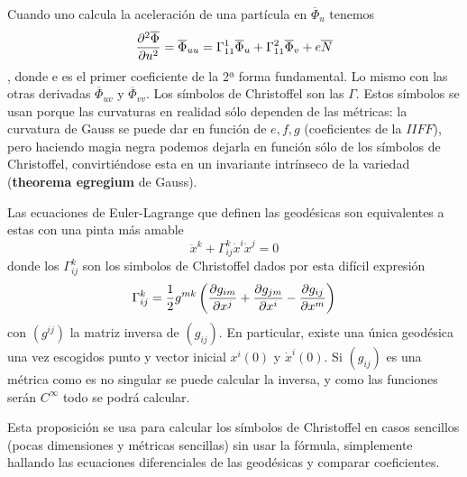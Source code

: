 \documentclass[palatino, bibnumbers]{apuntes}
\begin{document}
\indent Cuando uno calcula la aceleración de una partícula en $\overline{\Phi}_u$ tenemos $$\pdv[2]{\overline{\Phi}}{u}=\overline{\Phi}_{uu}=\Gamma^1_{11}\overline{\Phi}_u+\Gamma^2_{11}\overline{\Phi}_v+e\overline{N}$$, donde e es el primer coeficiente de la 2ª forma fundamental. Lo mismo con las otras derivadas $\overline{\Phi}_{uv}$ y $\overline{\Phi}_{vv}$. Los símbolos de Christoffel son las $\Gamma$. Estos símbolos se usan porque las curvaturas en realidad sólo dependen de las métricas: la curvatura de Gauss se puede dar en función de $e,f,g$ (coeficientes de la $II FF$), pero haciendo magia negra podemos dejarla en función sólo de los símbolos de Christoffel, convirtiéndose esta en un invariante intrínseco de la variedad (\textbf{theorema egregium} de Gauss).
\begin{prop}
Las ecuaciones de Euler-Lagrange que definen las geodésicas son equivalentes a estas con una pinta más amable
\begin{equation}
\ddot{x}^k+\Gamma^k_{ij}\dot{x}^i\dot{x}^j=0
\end{equation}
donde los $\Gamma^k_{ij}$ son los simbolos de Christoffel dados por esta difícil expresión
\begin{equation}
\Gamma^k_{ij}=\frac{1}{2}g^{mk}\left(\pdv{g_{im}}{x^j}+\pdv{g_{jm}}{x^i}-\pdv{g_{ij}}{x^m}\right)
\end{equation}
con $(g^{ij})$ la matriz inversa de $(g_{ij})$. En particular, existe una única geodésica una vez escogidos punto y vector inicial $x^i(0)$ y $\dot{x}^i(0)$. Si $(g_{ij})$ es una métrica como es no singular se puede calcular la inversa, y como las funciones serán $C^\infty$ todo se podrá calcular.
\end{prop}
\begin{obs} Esta proposición se usa para calcular los símbolos de Christoffel en casos sencillos (pocas dimensiones y métricas sencillas) sin usar la fórmula, simplemente hallando las ecuaciones diferenciales de las geodésicas y comparar coeficientes.
\end{obs}
\end{document}
